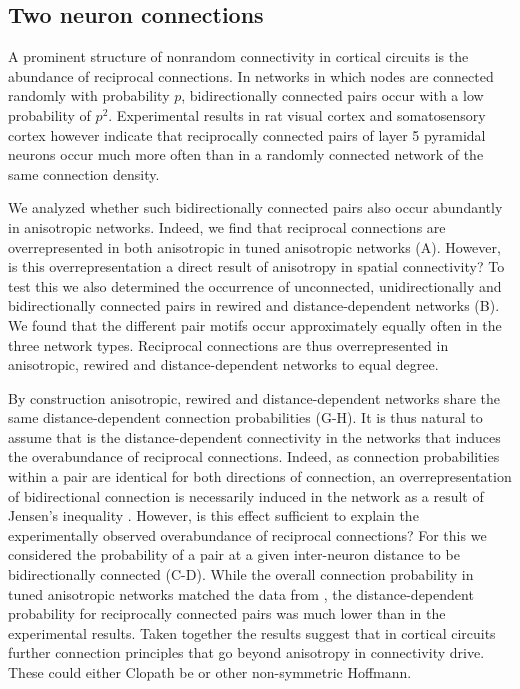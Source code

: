 \subsection*{Two neuron connections}

A prominent structure of nonrandom connectivity in cortical circuits
is the abundance of reciprocal connections. In networks in which nodes
are connected randomly with probability $p$, bidirectionally connected
pairs occur with a low probability of $p^2$. Experimental results in
 rat visual cortex \cite{Song2005} and somatosensory cortex
\cite{Markram1997, Perin2011} however indicate that reciprocally
connected pairs of layer 5 pyramidal neurons occur much more often
than in a randomly connected network of the same connection density.

We analyzed whether such bidirectionally connected pairs also occur
abundantly in anisotropic networks. Indeed, we find that reciprocal
connections are overrepresented in both anisotropic in tuned
anisotropic networks (A). However, is this
overrepresentation a direct result of anisotropy in spatial
connectivity? To test this we also determined the occurrence of
unconnected, unidirectionally and bidirectionally connected pairs in
rewired and distance-dependent networks (B). We
found that the different pair motifs occur approximately equally often
in the three network types. Reciprocal connections are thus
overrepresented in anisotropic, rewired and distance-dependent
networks to equal degree.



By construction anisotropic, rewired and distance-dependent networks
share the same distance-dependent connection probabilities
(G-H). It is thus natural to assume that is
the distance-dependent connectivity in the networks that induces the
overabundance of reciprocal connections. Indeed, as connection
probabilities within a pair are identical for both directions of
connection, an overrepresentation of bidirectional connection is
necessarily induced in the network as a result of Jensen's inequality
\cite{Hoffmann2017}. However, is this effect sufficient to explain the
experimentally observed overabundance of reciprocal connections? For
this we considered the probability of a pair at a given inter-neuron
distance to be bidirectionally connected
(C-D). While the overall connection probability
in tuned anisotropic networks matched the data from
\textcite{Perin2011}, the distance-dependent probability for
reciprocally connected pairs was much lower than in the experimental
results. Taken together the results suggest that in cortical circuits
further connection principles that go beyond anisotropy in
connectivity drive. These could either Clopath be or other
non-symmetric Hoffmann.


